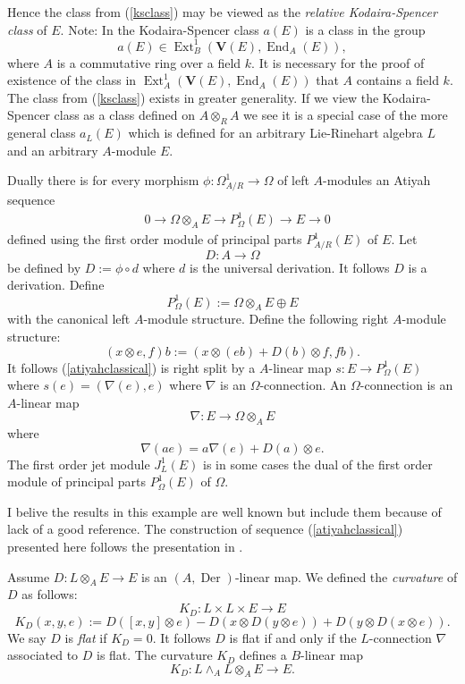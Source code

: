 \documentclass{amsart}
\theoremstyle{plain}
\theoremstyle{definition}
\theoremstyle{remark}
\numberwithin{equation}{theorem}
\begin{document}
Hence the class from (\ref{ksclass}) may be viewed as the \emph{relative Kodaira-Spencer class} of $E$. 
Note: In \cite{maa1} the Kodaira-Spencer class $a(E)$ is a class in the group 
\[ a(E)\in {\operatorname{Ext} }^1_B(\mathbf{V}(E), {\operatorname{End} }_{A}(E)) ,\]
where ${A}$ is a commutative ring over a field $k$. It is necessary for the proof of existence of the class in 
${\operatorname{Ext} }^1_{A}(\mathbf{V}(E), {\operatorname{End} }_{A}(E))$ that ${A}$ contains a field $k$. The class from (\ref{ksclass}) exists 
in greater generality. If we view the Kodaira-Spencer class as a class defined on ${A}\otimes_{R} {A}$ we see it is a 
special case of the more general class $a_L(E)$ which is defined for an arbitrary Lie-Rinehart algebra $L$ and
an arbitrary ${A}$-module $E$.

Dually there is for every morphism $\phi:\Omega^1_{{A}/{R}}\rightarrow \Omega$ of left ${A}$-modules an Atiyah sequence
\begin{align}
&\label{atiyahclassical}0\rightarrow \Omega \otimes_{A} E \rightarrow P^1_{\Omega}(E)\rightarrow E \rightarrow 0
\end{align}
defined using the first order module of principal parts $P^1_{{A}/{R}}(E)$ of $E$. Let
\[  D:{A}\rightarrow \Omega \]
be defined by $D:=\phi \circ d$ where $d$ is the universal derivation. It follows $D$ is a derivation.
Define
\[ P^1_{\Omega}(E):=\Omega \otimes_{A} E\oplus E \]
with the canonical left ${A}$-module structure. Define the following right ${A}$-module structure:
\[ (x\otimes e,f)b:=(x\otimes(eb)+D(b)\otimes f, fb).\]
It follows (\ref{atiyahclassical}) is right split by a ${A}$-linear map $s:E\rightarrow P^1_{\Omega}(E)$ where
$s(e)=(\nabla(e),e)$ where $\nabla$ is an $\Omega$-connection.
An $\Omega$-connection is an $A$-linear map
\[ \nabla:E\rightarrow \Omega \otimes_{A} E \]
where
\[ \nabla(ae)=a\nabla(e)+D(a)\otimes e.\]
The first order jet module $J^1_L(E)$ is in some cases the dual of the
first order module of principal parts $P^1_{\Omega}(E)$ of $\Omega$.

I belive the results in this example are well known but include them because of lack of a good reference.
The construction of sequence (\ref{atiyahclassical}) presented here follows the presentation in \cite{karoubi1}.

 Assume $D:L\otimes_A E\rightarrow E$ is an $({A},{\operatorname{Der} })$-linear map. We defined the \emph{curvature} 
of $D$ as follows:
\[ K_D:L\times L\times E\rightarrow E\]
\[K_D(x,y,e):=D([x,y]\otimes e)-D(x\otimes D(y\otimes e))+D(y\otimes D(x\otimes e)).\]
We say $D$ is \emph{flat} if $K_D=0$. It follows $D$ is flat if and only if the $L$-connection $\nabla$ associated
to $D$ is flat.
The curvature $K_D$ defines a  $B$-linear map
\[ K_D:L\wedge_{A} L\otimes_{A} E\rightarrow E.\]
\end{document}
